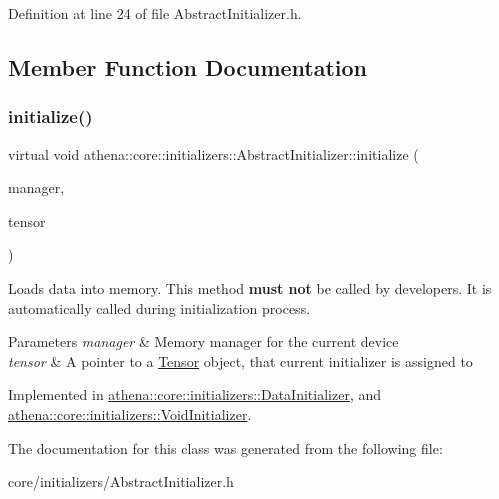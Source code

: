 Definition at line 24 of file Abstract\+Initializer.\+h.



\subsection{Member Function Documentation}
\mbox{\label{classathena_1_1core_1_1initializers_1_1_abstract_initializer_a9c0f0c57add306c9da8ffe8797532f62}} 
\subsubsection{\texorpdfstring{initialize()}{initialize()}}
{\footnotesize\ttfamily virtual void athena\+::core\+::initializers\+::\+Abstract\+Initializer\+::initialize (\begin{DoxyParamCaption}\item[{\mbox{\hyperlink{classathena_1_1backend_1_1_abstract_memory_manager}{athena\+::backend\+::\+Abstract\+Memory\+Manager}} $\ast$}]{manager,  }\item[{\mbox{\hyperlink{classathena_1_1core_1_1_tensor}{Tensor}} $\ast$}]{tensor }\end{DoxyParamCaption})\hspace{0.3cm}{\ttfamily [pure virtual]}}

Loads data into memory. This method {\bfseries must not} be called by developers. It is automatically called during initialization process. 
\begin{DoxyParams}{Parameters}
{\em manager} & Memory manager for the current device \\
\hline
{\em tensor} & A pointer to a \mbox{\hyperlink{classathena_1_1core_1_1_tensor}{Tensor}} object, that current initializer is assigned to \\
\hline
\end{DoxyParams}


Implemented in \mbox{\hyperlink{classathena_1_1core_1_1initializers_1_1_data_initializer_a984213526b2741e423f230098c71520a}{athena\+::core\+::initializers\+::\+Data\+Initializer}}, and \mbox{\hyperlink{classathena_1_1core_1_1initializers_1_1_void_initializer_adcb637175e8cad5841cb21e53e0e138f}{athena\+::core\+::initializers\+::\+Void\+Initializer}}.



The documentation for this class was generated from the following file\+:\begin{DoxyCompactItemize}
\item 
core/initializers/Abstract\+Initializer.\+h\end{DoxyCompactItemize}

